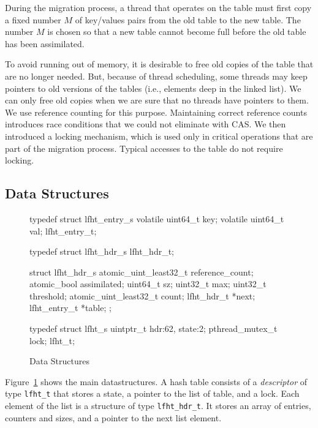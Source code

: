 During the migration process, a thread that operates on the table must
first copy a fixed number $M$ of key/values pairs from the old table
to the new table. The number $M$ is chosen so that a new table cannot
become full before the old table has been assimilated.

To avoid running out of memory, it is desirable to free old copies of
the table that are no longer needed. But, because of thread
scheduling, some threads may keep pointers to old versions of the
tables (i.e., elements deep in the linked list). We can only free old
copies when we are sure that no threads have pointers to them. We use
reference counting for this purpose. Maintaining correct reference
counts introduces race conditions that we could not eliminate with
CAS.  We then introduced a locking mechanism, which is used only in
critical operations that are part of the migration process. Typical
accesses to the table do not require locking.


\subsection{Data Structures}

\begin{figure}
\begin{center}
\begin{clisting}
typedef struct lfht_entry_s {
  volatile uint64_t  key;
  volatile uint64_t  val;
} lfht_entry_t;

typedef struct lfht_hdr_s lfht_hdr_t;

struct lfht_hdr_s {
  atomic_uint_least32_t reference_count;
  atomic_bool assimilated;
  uint64_t sz;
  uint32_t max;
  uint32_t threshold;
  atomic_uint_least32_t count;
  lfht_hdr_t *next;
  lfht_entry_t *table;
};

typedef struct lfht_s {
  uintptr_t hdr:62, state:2;
  pthread_mutex_t lock;
} lfht_t;
\end{clisting}
\end{center}
\caption{Data Structures}
\label{fig:datastructures}
\end{figure}

Figure~\ref{fig:datastructures} shows the main datastructures. A hash
table consists of a {\em descriptor\/} of type \texttt{lfht\_t} that
stores a state, a pointer to the list of table, and a lock. Each
element of the list is a structure of type \texttt{lfht\_hdr\_t}. It
stores an array of entries, counters and sizes, and a pointer to the
next list element.

